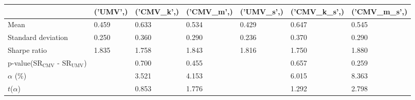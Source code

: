 \begin{tabular}{lllllll}
\toprule
 & ('UMV',) & ('CMV_k',) & ('CMV_m',) & ('UMV_s',) & ('CMV_k_s',) & ('CMV_m_s',) \\
\midrule
Mean & 0.459 & 0.633 & 0.534 & 0.429 & 0.647 & 0.545 \\
Standard deviation & 0.250 & 0.360 & 0.290 & 0.236 & 0.370 & 0.290 \\
Sharpe ratio & 1.835 & 1.758 & 1.843 & 1.816 & 1.750 & 1.880 \\
p-value(SR$_{\text{CMV}}$ - SR$_{\text{UMV}}$) &  & 0.700 & 0.455 &  & 0.657 & 0.259 \\
$\alpha$ (\%) &  & 3.521 & 4.153 &  & 6.015 & 8.363 \\
$t$($\alpha$) &  & 0.853 & 1.776 &  & 1.292 & 2.798 \\
\bottomrule
\end{tabular}
